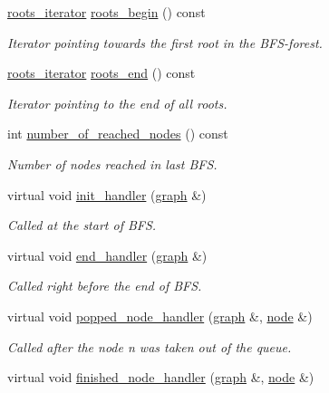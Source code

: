 \begin{DoxyCompactItemize}
\mbox{\hyperlink{classbfs_a70b915179053a2993154614d4358fdc1}{roots\+\_\+iterator}} \mbox{\hyperlink{classbfs_a45d58d06d0dcd6427edad2ec52a6ebb9}{roots\+\_\+begin}} () const
\begin{DoxyCompactList}\small\item\em Iterator pointing towards the first root in the B\+F\+S-\/forest. \end{DoxyCompactList}\item 
\mbox{\hyperlink{classbfs_a70b915179053a2993154614d4358fdc1}{roots\+\_\+iterator}} \mbox{\hyperlink{classbfs_ac84b90f777adeb90390689db62602d73}{roots\+\_\+end}} () const
\begin{DoxyCompactList}\small\item\em Iterator pointing to the end of all roots. \end{DoxyCompactList}\item 
int \mbox{\hyperlink{classbfs_abb971551139ed87e6c78062275301c1b}{number\+\_\+of\+\_\+reached\+\_\+nodes}} () const
\begin{DoxyCompactList}\small\item\em Number of nodes reached in last B\+FS. \end{DoxyCompactList}\item 
virtual void \mbox{\hyperlink{classbfs_a558582dd7a92ce3b3b512c523e589c23}{init\+\_\+handler}} (\mbox{\hyperlink{classgraph}{graph}} \&)
\begin{DoxyCompactList}\small\item\em Called at the start of B\+FS. \end{DoxyCompactList}\item 
virtual void \mbox{\hyperlink{classbfs_adbabb41ab56b92606fe7b53f346142ed}{end\+\_\+handler}} (\mbox{\hyperlink{classgraph}{graph}} \&)
\begin{DoxyCompactList}\small\item\em Called right before the end of B\+FS. \end{DoxyCompactList}\item 
virtual void \mbox{\hyperlink{classbfs_a09c7e35a4c20a24f1a54d63a0a9319a5}{popped\+\_\+node\+\_\+handler}} (\mbox{\hyperlink{classgraph}{graph}} \&, \mbox{\hyperlink{classnode}{node}} \&)
\begin{DoxyCompactList}\small\item\em Called after the node {\itshape n} was taken out of the queue. \end{DoxyCompactList}\item 
virtual void \mbox{\hyperlink{classbfs_a4d3f1d569910388b2ccece7cedd8bae4}{finished\+\_\+node\+\_\+handler}} (\mbox{\hyperlink{classgraph}{graph}} \&, \mbox{\hyperlink{classnode}{node}} \&)

\end{DoxyCompactItemize}
